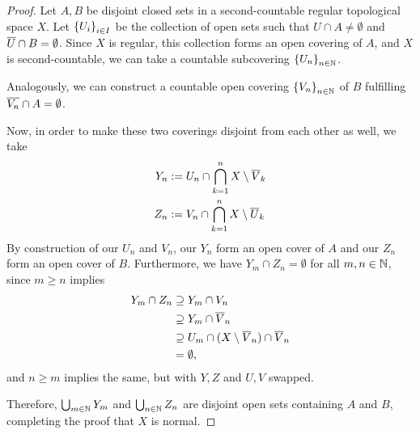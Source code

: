 \begin{proof}
	Let $A,B$ be disjoint closed sets in a second-countable regular topological space $X$. Let $\qty{U_i}_{i \in I}$ be the collection of open sets such that $U \cap A \neq \emptyset$ and $\overline{{U}} \cap B = \emptyset$. Since $X$ is regular, this collection forms an open covering of $A$, and $X$ is second-countable, we can take a countable subcovering $\qty{U_n}_{n \in \mathbb{N}}$. 
	
	Analogously, we can construct a countable open covering $\qty{V_n}_{n \in \mathbb{N}}$ of $B$ fulfilling $\overline{{V_n}} \cap A = \emptyset$.
	
	Now, in order to make these two coverings disjoint from each other as well, we take
	\begin{align*}
		Y_n &:= U_n \cap \bigcap_{k = 1}^n X \setminus \overline{{V}}_k\\
		Z_n &:= V_n \cap \bigcap_{k = 1}^n X \setminus \overline{{U}}_k
	\end{align*}
	By construction of our $U_n$ and $V_n$, our $Y_n$ form an open cover of $A$ and our $Z_n$ form an open cover of $B$. Furthermore, we have $Y_m \cap Z_n = \emptyset$ for all $m,n \in \mathbb{N}$, since $m \geq n$ implies
	\begin{align*}
		Y_m \cap Z_n 
		&\supseteq Y_m \cap V_n\\
		&\supseteq Y_m \cap \overline{{V}}_n\\
		&\supseteq U_m \cap (X \setminus \overline{{V}}_n) \cap \overline{{V}}_n\\
		&= \emptyset,
	\end{align*}
	and $n \geq m$ implies the same, but with $Y,Z$ and $U,V$ swapped.
	
	Therefore, $\bigcup_{m \in \mathbb{N}} Y_m$ and $\bigcup_{n \in \mathbb{N}} Z_n$ are disjoint open sets containing $A$ and $B$, completing the proof that $X$ is normal.
\end{proof}

\clearpage
